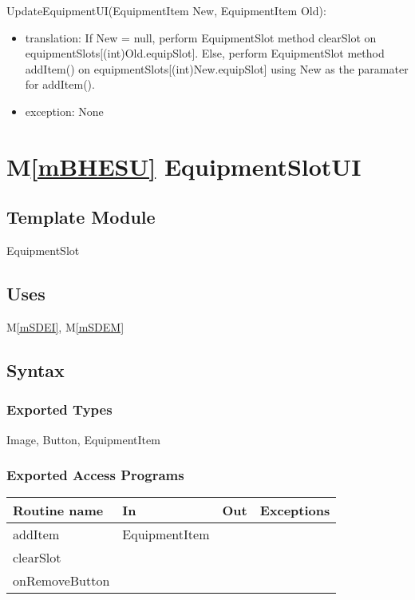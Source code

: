 \documentclass[12pt]{article}
\newcommand{\mref}[1]{M\ref{#1}}
\begin{document}
\noindent UpdateEquipmentUI(EquipmentItem New, EquipmentItem Old):
\begin{itemize}
\item translation: If New = null, perform EquipmentSlot method clearSlot on equipmentSlots[(int)Old.equipSlot]. Else, perform EquipmentSlot method addItem() on equipmentSlots[(int)New.equipSlot] using New as the paramater for addItem().
\item exception: None
\end{itemize}

\newpage

\section* {\mref{mBHESU} EquipmentSlotUI}

\subsection*{Template Module}

EquipmentSlot

\subsection* {Uses}

\mref{mSDEI}, \mref{mSDEM}

\subsection* {Syntax}

\subsubsection* {Exported Types}

Image, Button, EquipmentItem

\subsubsection* {Exported Access Programs}

\begin{tabular}{| l | l | l | l |}
\hline
\textbf{Routine name} & \textbf{In} & \textbf{Out} & \textbf{Exceptions}\\
\hline
addItem & EquipmentItem & ~  & ~\\
clearSlot & ~ & ~ & ~\\
onRemoveButton & ~ & ~ & ~\\
\hline
\end{tabular}
\end{document}
